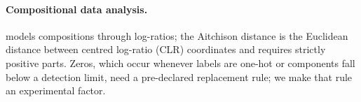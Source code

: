 \paragraph{Compositional data analysis.} \citet{aitchison1982statistical} models compositions through log-ratios; the Aitchison distance is the Euclidean distance between centred log-ratio (CLR) coordinates and requires strictly positive parts. Zeros, which occur whenever labels are one-hot or components fall below a detection limit, need a pre-declared replacement rule; we make that rule an experimental factor.
